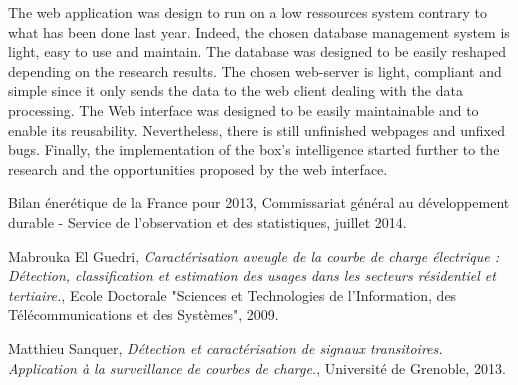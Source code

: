 The web application was design to run on a low ressources system contrary to what has been done last year. Indeed, the chosen database management system is light, easy to use and maintain. The database was designed to be easily reshaped depending on the research results. The chosen web-server is light, compliant and simple since it only sends the data to the web client dealing with the data processing. The Web interface was designed to be easily maintainable and to enable its reusability. Nevertheless, there is still unfinished webpages and unfixed bugs. Finally, the implementation of the box's intelligence started further to the research and the opportunities proposed by the web interface.



\begin{thebibliography}{10}
 Bilan \'ener\'etique de la France pour 2013, Commissariat g\'en\'eral au d\'eveloppement durable - Service de l'observation et des statistiques, juillet 2014.
 
    Mabrouka El Guedri, \emph{Caract\'erisation aveugle de la courbe de charge \'electrique : D\'etection, classification et estimation des usages dans les secteurs r\'esidentiel et tertiaire.}, Ecole Doctorale "Sciences et Technologies de l'Information, des T\'el\'ecommunications et des Syst\`emes", 2009.
 
    Matthieu Sanquer, \textit{D\'etection et caract\'erisation de signaux transitoires. Application \`a la surveillance de courbes de charge.}, Universit\'e de Grenoble, 2013.
\end{thebibliography}